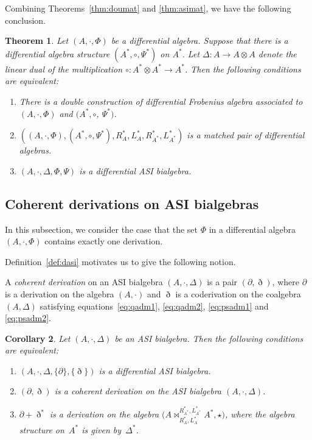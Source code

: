 \documentclass[pdftex]{sigma}
\numberwithin{equation}{section}
\newtheorem{Theorem}{Theorem}[section]
\newtheorem{Corollary}[Theorem]{Corollary}
\begin{document}
Combining Theorems~\ref{thm:doumat} and \ref{thm:asimat}, we have the following conclusion.
\begin{Theorem}\label{thm:asieqv}
 Let $(A, \cdot, \Phi)$ be a differential algebra.
 Suppose that there is a differential algebra structure $(A^*, \circ, \Psi^*)$ on $A^*$.
 Let $\Delta\colon A \to A \otimes A$ denote the linear dual of the multiplication $\circ\colon A^* \otimes A^* \to A^*$.
 Then the following conditions are equivalent:
 \begin{enumerate}\itemsep=0pt
 \item[$1.$] There is a double construction of differential Frobenius algebra associated to $(A, \cdot, \Phi)$ and $(A^*, \circ$, $\Psi^*)$.
 \item[$2.$] $((A, \cdot, \Phi), (A^*, \circ, \Psi^*), R^*_A, L^*_A, R^*_{A^*}, L^*_{A^*})$ is a matched pair of differential algebras.
 \item[$3.$] $(A, \cdot, \Delta, \Phi, \Psi)$ is a differential ASI bialgebra.
 \end{enumerate}
\end{Theorem}

\subsection{Coherent derivations on ASI bialgebras}
In this subsection, we consider the case that the set $\Phi$ in a differential algebra $(A, \cdot, \Phi)$ contains exactly one derivation.

Definition~\ref{def:dasi} motivates us to give the following notion.

\begin{Definition}\label{def:chd} A \textit{coherent derivation} on an ASI bialgebra $(A, \cdot, \Delta)$ is a pair $(\partial, \eth)$,
 where $\partial$ is a derivation on the algebra $(A, \cdot)$ and $\eth$ is a coderivation on the coalgebra $(A, \Delta)$
 satisfying equations~\eqref{eq:qadm1}, \eqref{eq:qadm2}, \eqref{eq:psadm1} and \eqref{eq:psadm2}.
\end{Definition}

\begin{Corollary}\label{cor:chd}
Let $(A,\cdot,\Delta)$ be an ASI bialgebra. Then the following conditions are equivalent:
\begin{enumerate}\itemsep=0pt
\item[$1.$]%
$(A, \cdot, \Delta, \{\partial\}, \{\eth\})$ is a differential ASI bialgebra.
\item[$2.$]%
$(\partial, \eth)$ is a coherent derivation on the ASI bialgebra $(A, \cdot, \Delta)$.
\item[$3.$]%
$\partial + \eth^*$ is a derivation on the algebra $\big(A \bowtie_{R_A^*, L_A^*}^{R_{A^*}^*, L_{A^*}^*}
A^*, \star\big)$, where the algebra structure on~$A^*$ is given by~$\Delta^*$.
\end{enumerate}
\end{Corollary}
\end{document}

